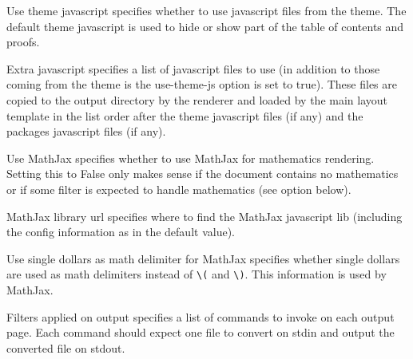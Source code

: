 \begin{configuration}{Use theme javascript}
specifies whether to use javascript files from the theme. The default
theme javascript is used to hide or show part of the table of contents
and proofs.
\end{configuration}

\begin{configuration}{Extra javascript}
specifies a list of javascript files to use (in addition
to those coming from the theme is the use-theme-js option is set to true).
These files are copied to the output directory by the
renderer and loaded by the main layout template in the list order after
the theme javascript files (if any) and the packages javascript files (if any).
\end{configuration}

\begin{configuration}{Use MathJax}
specifies whether to use MathJax for mathematics rendering. Setting this
to False only makes sense if the document contains no mathematics or if
some filter is expected to handle mathematics (see
 option below).
\end{configuration}

\begin{configuration}{MathJax library url}
specifies where to find the MathJax javascript lib (including the config
information as in the default value).
\end{configuration}

\begin{configuration}{Use single dollars as math delimiter for MathJax}
specifies whether single dollars are used as math delimiters instead of
\verb+\(+ and \verb+\)+. This information is used by MathJax.
\end{configuration}


\begin{configuration}{Filters applied on output}
specifies a list of commands to invoke on each output
page. Each command should expect one file to convert on stdin and output
the converted file on stdout.
\end{configuration}


